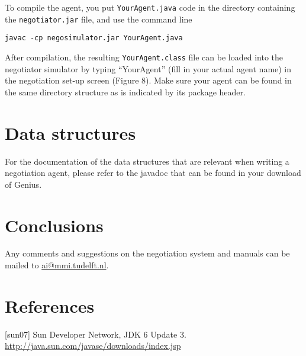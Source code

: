 \documentclass[]{article}
\begin{document}
To compile the agent, you put \texttt{YourAgent.java} code in the directory containing the \texttt{negotiator.jar} file, and use the command line

\texttt{javac -cp negosimulator.jar YourAgent.java}

After compilation, the resulting \texttt{YourAgent.class} file can be loaded into the negotiator simulator by typing ``YourAgent'' (fill in your actual agent name) in the negotiation set-up screen (Figure 8). Make sure your agent can be found in the same directory structure as is indicated by its package header.
 
\section{Data structures}
For the documentation of the data structures that are relevant when writing a negotiation agent, please refer to the javadoc that can be found in your download of Genius. 
 
\section{Conclusions}
Any comments and suggestions on the negotiation system and manuals can be mailed to \url{ai@mmi.tudelft.nl}.

\section{References}
[sun07] Sun Developer Network, JDK 6 Update 3. \url{http://java.sun.com/javase/downloads/index.jsp}



\end{document}

